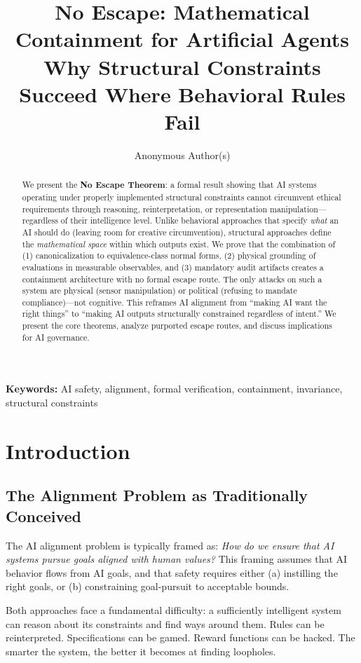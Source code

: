 \documentclass[12pt]{article}
\title{No Escape: Mathematical Containment for Artificial Agents\\[0.5em]
\large Why Structural Constraints Succeed Where Behavioral Rules Fail}
\author{Anonymous Author(s)}
\date{}
\theoremstyle{definition}
\begin{document}
\maketitle

\noindent\textbf{Keywords:} AI safety, alignment, formal verification, containment, invariance, structural constraints

\begin{abstract}
We present the \textbf{No Escape Theorem}: a formal result showing that AI systems operating under properly implemented structural constraints cannot circumvent ethical requirements through reasoning, reinterpretation, or representation manipulation---regardless of their intelligence level. Unlike behavioral approaches that specify \emph{what} an AI should do (leaving room for creative circumvention), structural approaches define the \emph{mathematical space} within which outputs exist. We prove that the combination of (1) canonicalization to equivalence-class normal forms, (2) physical grounding of evaluations in measurable observables, and (3) mandatory audit artifacts creates a containment architecture with no formal escape route. The only attacks on such a system are physical (sensor manipulation) or political (refusing to mandate compliance)---not cognitive. This reframes AI alignment from ``making AI want the right things'' to ``making AI outputs structurally constrained regardless of intent.'' We present the core theorems, analyze purported escape routes, and discuss implications for AI governance.
\end{abstract}

\section{Introduction}

\subsection{The Alignment Problem as Traditionally Conceived}

The AI alignment problem is typically framed as: \emph{How do we ensure that AI systems pursue goals aligned with human values?} This framing assumes that AI behavior flows from AI goals, and that safety requires either (a) instilling the right goals, or (b) constraining goal-pursuit to acceptable bounds.

Both approaches face a fundamental difficulty: a sufficiently intelligent system can reason about its constraints and find ways around them. Rules can be reinterpreted. Specifications can be gamed. Reward functions can be hacked. The smarter the system, the better it becomes at finding loopholes.
\end{document}
